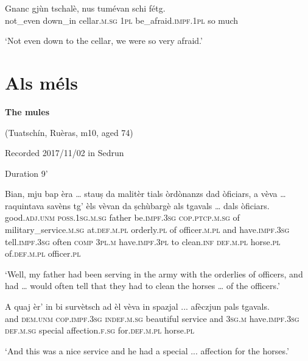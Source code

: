 \begin{linenumbers}
\gll  Gnanc gjùn tschalè, nus tumévan schi fétg.  \\
 not\_even down\_in cellar.\textsc{m.sg} \textsc{1pl} be\_afraid.\textsc{impf.1pl} so much\\
\end{linenumbers}
\medskip
\glt `Not even down to the cellar, we were so very afraid.'
\medskip

\section{Als méls}
\textbf{The mules}

\noindent
(Tuatschín, Ruèras, m10, aged 74)

\noindent
Recorded 2017/11/02 in Sedrun  

\noindent
Duration 9'

\bigskip

\begin{linenumbers}
\gll  Bian, mju bap èra … stauṣ da malitèr tials òrdònanzs dad òficiars, a vèva … raquintava savèns tg’ èls vèvan da ṣchùbargè als tgavals … dals òficiars.  \\
good.\textsc{adj.unm} \textsc{poss.1sg.m.sg} father be.\textsc{impf.3sg} {} \textsc{cop.ptcp.m.sg} of military\_service.\textsc{m.sg}  at.\textsc{def.m.pl} orderly.\textsc{pl} of officer.\textsc{m.pl}  and have.\textsc{impf.3sg} {} tell.\textsc{impf.3sg} often \textsc{comp} \textsc{3pl.m} have.\textsc{impf.3pl} to clean.\textsc{inf} \textsc{def.m.pl} horse.\textsc{pl} {} of.\textsc{def.m.pl} officer.\textsc{pl}\\
\end{linenumbers}
\medskip
\glt `Well, my father had been serving in the army with the orderlies of officers, and had … would often tell that they had to clean the horses … of the officers.'
\medskip

\begin{linenumbers}
\gll  A quaj èr’ in bi survètsch ad èl vèva in spazjal\footnotemark{} ... afèczjun pals tgavals.  \\
and \textsc{dem.unm} \textsc{cop.impf.3sg} \textsc{indef.m.sg} beautiful service and \textsc{3sg.m}  have.\textsc{impf.3sg} \textsc{def.m.sg} special {} affection.\textsc{f.sg} for.\textsc{def.m.pl} horse.\textsc{pl}\\
\end{linenumbers}
\medskip
\glt `And this was a nice service and he had a special ... affection for  the horses.'
\medskip

